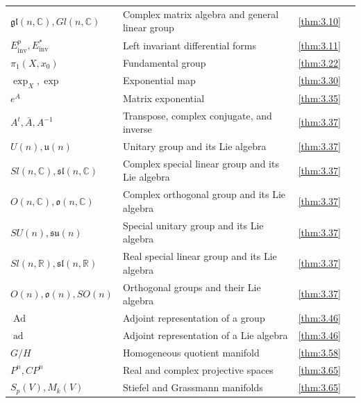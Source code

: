 {\begin{longtable}{@{}>{\raggedright\arraybackslash}p{.39\linewidth}>{\raggedright\arraybackslash}p{.39\linewidth}r r@{}}
$\mathfrak{gl}(n,\allowbreak \mathbb C),\allowbreak Gl(n,\allowbreak \mathbb C)$ & Complex matrix algebra and general linear group & \ref{thm:3.10} & \pageref{thm:3.10} \\
$E_{\mathrm{inv}}^p,\allowbreak E_{\mathrm{inv}}^*$ & Left invariant differential forms & \ref{thm:3.11} & \pageref{thm:3.11} \\
$\pi_{1}(X,\allowbreak x_{0})$ & Fundamental group & \ref{thm:3.22} & \pageref{thm:3.22} \\
$\exp_X,\allowbreak \exp$ & Exponential map & \ref{thm:3.30} & \pageref{thm:3.30} \\
$e^{A}$ & Matrix exponential & \ref{thm:3.35} & \pageref{thm:3.35} \\
$A^t,\allowbreak \bar A,\allowbreak A^{-1}$ & Transpose, complex conjugate, and inverse & \ref{thm:3.37} & \pageref{thm:3.37} \\
$U(n),\allowbreak \mathfrak u(n)$ & Unitary group and its Lie algebra & \ref{thm:3.37} & \pageref{thm:3.37} \\
$Sl(n,\allowbreak \mathbb C),\allowbreak \mathfrak{sl}(n,\allowbreak \mathbb C)$ & Complex special linear group and its Lie algebra & \ref{thm:3.37} & \pageref{thm:3.37} \\
$O(n,\allowbreak \mathbb C),\allowbreak \mathfrak o(n,\allowbreak \mathbb C)$ & Complex orthogonal group and its Lie algebra & \ref{thm:3.37} & \pageref{thm:3.37} \\
$SU(n),\allowbreak \mathfrak{su}(n)$ & Special unitary group and its Lie algebra & \ref{thm:3.37} & \pageref{thm:3.37} \\
$Sl(n,\allowbreak \mathbb R),\allowbreak \mathfrak{sl}(n,\allowbreak \mathbb R)$ & Real special linear group and its Lie algebra & \ref{thm:3.37} & \pageref{thm:3.37} \\
$O(n),\allowbreak \mathfrak o(n),\allowbreak SO(n)$ & Orthogonal groups and their Lie algebra & \ref{thm:3.37} & \pageref{thm:3.37} \\
$\operatorname{Ad}$ & Adjoint representation of a group & \ref{thm:3.46} & \pageref{thm:3.46} \\
$\operatorname{ad}$ & Adjoint representation of a Lie algebra & \ref{thm:3.46} & \pageref{thm:3.46} \\
$G/H$ & Homogeneous quotient manifold & \ref{thm:3.58} & \pageref{thm:3.58} \\
$P^{n},\allowbreak CP^{n}$ & Real and complex projective spaces & \ref{thm:3.65} & \pageref{thm:3.65} \\
$S_{p}(V),\allowbreak M_{k}(V)$ & Stiefel and Grassmann manifolds & \ref{thm:3.65} & \pageref{thm:3.65} \\

\end{longtable}}

